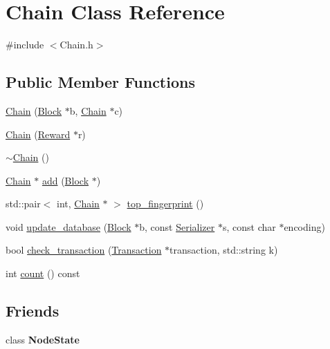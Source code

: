 \hypertarget{classChain}{}\section{Chain Class Reference}
\label{classChain}


{\ttfamily \#include $<$Chain.\+h$>$}

\subsection*{Public Member Functions}
\begin{DoxyCompactItemize}
\item 
\mbox{\hyperlink{classChain_ae70c386f5d7b2e333419296545656907}{Chain}} (\mbox{\hyperlink{classBlock}{Block}} $\ast$b, \mbox{\hyperlink{classChain}{Chain}} $\ast$c)
\item 
\mbox{\hyperlink{classChain_a6779b5168023552f943c54baed7e7cd4}{Chain}} (\mbox{\hyperlink{classReward}{Reward}} $\ast$r)
\item 
\mbox{\hyperlink{classChain_a06b56afcf5b9ef0c6371b49ae2eef2da}{$\sim$\+Chain}} ()
\item 
\mbox{\hyperlink{classChain}{Chain}} $\ast$ \mbox{\hyperlink{classChain_a7a271a75a12aeae52a2645dcaa14549c}{add}} (\mbox{\hyperlink{classBlock}{Block}} $\ast$)
\item 
std\+::pair$<$ int, \mbox{\hyperlink{classChain}{Chain}} $\ast$ $>$ \mbox{\hyperlink{classChain_a5ee2e1efbfe8d2896b0ac836fb750362}{top\+\_\+fingerprint}} ()
\item 
void \mbox{\hyperlink{classChain_a19dda9a394df1d45b014c649eb77cb64}{update\+\_\+database}} (\mbox{\hyperlink{classBlock}{Block}} $\ast$b, const \mbox{\hyperlink{classSerializer}{Serializer}} $\ast$s, const char $\ast$encoding)
\item 
bool \mbox{\hyperlink{classChain_a5725ffa89b1f0333536238951d9acd91}{check\+\_\+transaction}} (\mbox{\hyperlink{classTransaction}{Transaction}} $\ast$transaction, std\+::string k)
\item 
int \mbox{\hyperlink{classChain_ad06a7e312123831339b614a74ff5c9e0}{count}} () const
\end{DoxyCompactItemize}
\subsection*{Friends}
\begin{DoxyCompactItemize}
\item 
\mbox{\label{classChain_adfdd1242f00ef4da9a9a01d996fc292c}} 
class {\bfseries Node\+State}
\end{DoxyCompactItemize}


